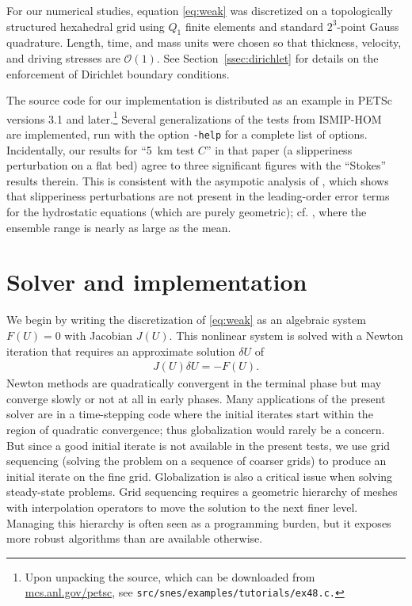 \documentclass[3p]{elsarticle}
\newcommand{\bigO}{{\mathcal{O}}}
\begin{document}
For our numerical studies, equation \eqref{eq:weak} was discretized on a topologically structured hexahedral grid using $Q_1$ finite elements and standard $2^3$-point Gauss quadrature.  Length, time, and mass units were chosen so that thickness, velocity, and driving stresses are $\bigO(1)$.  See Section~\ref{ssec:dirichlet} for details on the enforcement of Dirichlet boundary conditions.

The source code for our implementation is distributed as an example in PETSc~\cite{petsc-web-page} versions 3.1 and later.\footnote{Upon unpacking the source, which can be downloaded from \href{http://mcs.anl.gov/petsc}{mcs.anl.gov/petsc}, see \texttt{src/snes/examples/tutorials/ex48.c.}}  Several generalizations of the tests from ISMIP-HOM~\cite{pattyn2008beh} are implemented, run with the option \texttt{-help} for a complete list of options.  Incidentally, our results for ``\SI{5}{\kilo\metre} test $C$'' in that paper (a slipperiness perturbation on a flat bed) agree to three significant figures with the ``Stokes'' results therein.  This is consistent with the asympotic analysis of \cite{schoof2010thin}, which shows that slipperiness perturbations are not present in the leading-order error terms for the hydrostatic equations (which are purely geometric); cf. \cite[Table~4 and Figure~8]{pattyn2008beh}, where the ensemble range is nearly as large as the mean.

\section{Solver and implementation}\label{sec:solver}
We begin by writing the discretization of \eqref{eq:weak} as an algebraic system $F(U) = 0$ with
Jacobian $J(U)$.  This nonlinear system is solved with a Newton iteration that requires an
approximate solution $\delta U$ of
\begin{align}\label{eq:newton-step}
  J(U)\delta U = -F(U) .
\end{align}
Newton methods are quadratically convergent in the terminal phase but may converge slowly or
not at all in early phases.  Many applications of the present solver are in a time-stepping code
where the initial iterates start within the region of quadratic convergence; thus globalization
would rarely be a concern. But since a good initial iterate is not available in the present tests,
we use grid sequencing (solving the problem on a sequence of coarser grids) to produce an initial
iterate on the fine grid.
Globalization is also a critical issue when solving steady-state problems.
Grid sequencing requires a geometric hierarchy of meshes with interpolation operators to move the solution to the next finer level.
Managing this hierarchy is often seen as a programming burden, but it exposes more robust algorithms than are available otherwise.
\end{document}
